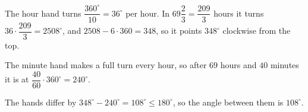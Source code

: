 The hour hand turns $\dfrac{360^\circ}{10}=36^\circ$ per hour. In $69\dfrac23=\dfrac{209}3$ hours it turns $36\cdot\dfrac{209}3=2508^\circ$, and $2508-6\cdot360=348$, so it points $348^\circ$ clockwise from the top.

The minute hand makes a full turn every hour, so after $69$ hours and $40$ minutes it is at $\dfrac{40}{60}\cdot360^\circ=240^\circ$.

The hands differ by $348^\circ-240^\circ=108^\circ\le180^\circ$, so the angle between them is $\boxed{108^\circ}$.
